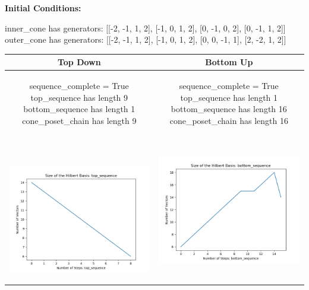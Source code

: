 \documentclass[10pt]{article}
\begin{document}
\textbf{Initial Conditions:}
\begin{SAGE}
inner_cone has generators: 
[[-2, -1, 1, 2], [-1, 0, 1, 2], [0, -1, 0, 2], [0, -1, 1, 2]]
outer_cone has generators: 
[[-2, -1, 1, 2], [-1, 0, 1, 2], [0, 0, -1, 1], [2, -2, 1, 2]]

\end{SAGE}
\begin{tabular}{c|c}
\textbf{Top Down} & \textbf{Bottom Up} \\ \hline  
\begin{SAGE}
	sequence_complete = True
	top_sequence has length 9
	bottom_sequence has length 1
	cone_poset_chain has length 9
\end{SAGE} 
&
\begin{SAGE}
	sequence_complete = True
	top_sequence has length 1
	bottom_sequence has length 16
	cone_poset_chain has length 16
\end{SAGE} 
\\ \hline
\
\begin{minipage}{.45\textwidth}
\includegraphics[width=\textwidth]{"DATA/4d/4 generators 2 bound D/top_sequence SIZE"}
\end{minipage} &
\begin{minipage}{.45\textwidth}
\includegraphics[width=\textwidth]{"DATA/4d/4 generators 2 bound D bottomup/bottom_sequence SIZE"}

\end{minipage}
\end{tabular}
\end{document}

